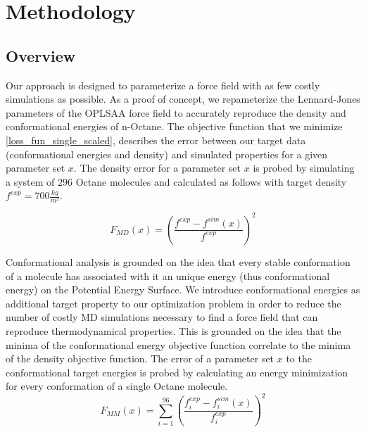 \documentclass[preprint,12pt]{elsarticle}
\begin{document}



\section{Methodology}

\subsection{Overview}
Our approach is designed to parameterize a force field with as few costly simulations as possible. As a proof of concept, we repameterize the Lennard-Jones parameters of the OPLSAA force field to accurately reproduce the density and conformational energies of n-Octane. The objective function that we minimize \ref{loss_fun_single_scaled}, describes the error between our target data (conformational energies and density) and simulated properties for a given parameter set $x$. 
The density error for a parameter set $x$ is probed by simulating a system of $296$ Octane molecules and calculated as follows with target density $f^{exp} = 700 \frac{kg}{m^3}$.

\begin{equation}\label{loss_fun_md}
F_{MD}(x)=(\frac{f^{exp}-f^{sim}(x)}{f^{exp}})^2
\end{equation}

Conformational analysis is grounded on the idea that every stable conformation of a molecule has associated with it an unique energy (thus conformational energy) on the Potential Energy Surface. We introduce conformational energies as additional target property to our optimization problem in order to reduce the number of costly MD simulations necessary to find a force field that can reproduce thermodynamical properties. This is grounded on the idea that the minima of the conformational energy objective function correlate to the minima of the density objective function.
The error of a parameter set $x$ to the conformational target energies is probed by calculating an energy minimization for every conformation of a single Octane molecule.
\begin{equation}\label{loss_fun_mm}
F_{MM}(x)=\sum_{i=1}^{96}(\frac{f^{exp}_i-f^{sim}_i(x)}{f^{exp}_i})^2
\end{equation}
\end{document}
